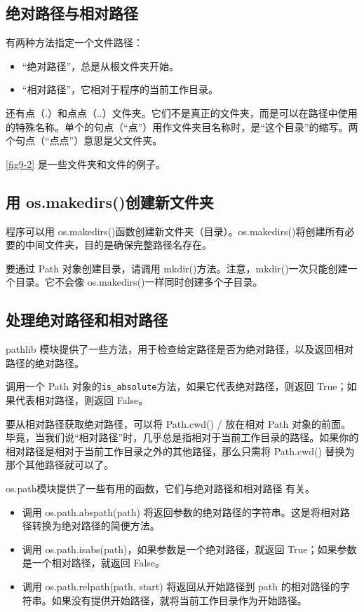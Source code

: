 \subsection{绝对路径与相对路径}
有两种方法指定一个文件路径：
\begin{itemize}
    \item  “绝对路径”，总是从根文件夹开始。
    \item “相对路径”，它相对于程序的当前工作目录。
\end{itemize}
还有点（.）和点点（..）文件夹。它们不是真正的文件夹，而是可以在路径中使用的特殊名称。单个的句点（“点”）用作文件夹目名称时，是“这个目录”的缩写。两个句点（“点点”）意思是父文件夹。

\autoref{fig9-2} 是一些文件夹和文件的例子。
\subsection{用 os.makedirs()创建新文件夹}
程序可以用 os.makedirs()函数创建新文件夹（目录）。os.makedirs()将创建所有必要的中间文件夹，目的是确保完整路径名存在。

要通过 Path 对象创建目录，请调用 mkdir()方法。注意，mkdir()一次只能创建一个目录。它不会像 os.makedirs()一样同时创建多个子目录。
\subsection{处理绝对路径和相对路径}
pathlib 模块提供了一些方法，用于检查给定路径是否为绝对路径，以及返回相对路径的绝对路径。

调用一个 Path 对象的\lstinline{is_absolute}方法，如果它代表绝对路径，则返回 True；如果代表相对路径，则返回 False。

要从相对路径获取绝对路径，可以将 Path.cwd() / 放在相对 Path 对象的前面。毕竟，当我们说“相对路径”时，几乎总是指相对于当前工作目录的路径。如果你的相对路径是相对于当前工作目录之外的其他路径，那么只需将 Path.cwd() 替换为那个其他路径就可以了。

os.path模块提供了一些有用的函数，它们与绝对路径和相对路径
有关。
\begin{itemize}
    \item 调用 os.path.abspath(path) 将返回参数的绝对路径的字符串。这是将相对路径转换为绝对路径的简便方法。
    \item 调用 os.path.isabs(path)，如果参数是一个绝对路径，就返回 True；如果参数是一个相对路径，就返回 False。
    \item 调用 os.path.relpath(path, start) 将返回从开始路径到 path 的相对路径的字符串。如果没有提供开始路径，就将当前工作目录作为开始路径。
\end{itemize}

